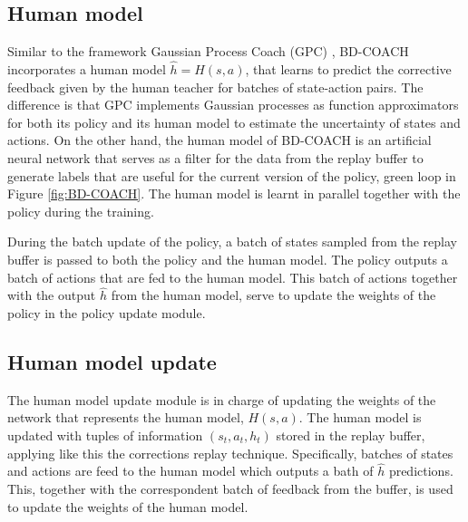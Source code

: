 \subsection*{Human model}


Similar to the framework Gaussian Process Coach (GPC) \cite{Gaussian-COACH-wout:2019}, BD-COACH incorporates a human model $\hat{h} = H(s, a)$, that learns to predict the corrective feedback given by the human teacher for batches of state-action pairs. The difference is that GPC implements Gaussian processes as function approximators for both its policy and its human model to estimate the uncertainty of states and actions. On the other hand, the human model of BD-COACH is an artificial neural network that serves as a filter for the data from the replay buffer to generate labels that are useful for the current version of the policy, green loop in Figure \ref{fig:BD-COACH}. The human model is learnt in parallel together with the policy during the training. 





During the batch update of the policy, a batch of states sampled from the replay buffer is passed to both the policy and the human model. The policy outputs a batch of actions that are fed to the human model. This batch of actions together with the output $\hat{h}$ from the human model, serve to update the weights of the policy in the policy update module. 



\subsection*{Human model update}

The human model update module is in charge of updating the weights of the network that represents the human model, $H(s, a)$. The human model is updated with tuples of information $(s_t, a_t, h_t)$ stored in the replay buffer, applying like this the corrections replay technique. Specifically, batches of states and actions are feed to the human model which outputs a bath of $\hat{h}$ predictions. This, together with the correspondent batch of feedback from the buffer, is used to update the weights of the human model.

